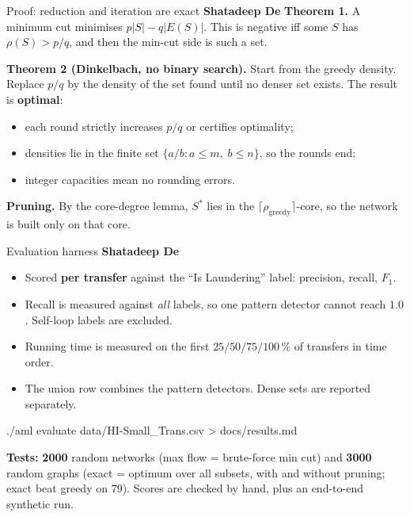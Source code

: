 \documentclass[aspectratio=169,11pt]{beamer}
\newcommand{\memberbadge}[1]{%
  \hfill{\small\bfseries\color{memberred}#1}%
}
\begin{document}
\begin{frame}{Proof: reduction and iteration are exact \memberbadge{Shatadeep De}}
\textbf{Theorem 1.} A minimum cut minimises $p|S| - q|E(S)|$. This is negative iff some $S$ has $\rho(S) > p/q$, and then the min-cut side is such a set.

\vspace{0.25cm}
\textbf{Theorem 2 (Dinkelbach, no binary search).} Start from the greedy density. Replace $p/q$ by the density of the set found until no denser set exists. The result is \textbf{optimal}:
\begin{itemize}
\setlength{\itemsep}{0.3em}
\item each round strictly increases $p/q$ or certifies optimality;
\item densities lie in the finite set $\{a/b : a \le m,\; b \le n\}$, so the rounds end;
\item integer capacities mean no rounding errors.
\end{itemize}

\vspace{0.25cm}
\textbf{Pruning.} By the core-degree lemma, $S^*$ lies in the $\lceil \rho_{\text{greedy}} \rceil$-core, so the network is built only on that core.
\end{frame}

\begin{frame}{Evaluation harness \memberbadge{Shatadeep De}}
\begin{itemize}
\setlength{\itemsep}{0.45em}
\item Scored \textbf{per transfer} against the ``Is Laundering'' label: precision, recall, $F_1$.
\item Recall is measured against \emph{all} labels, so one pattern detector cannot reach $1.0$. Self-loop labels are excluded.
\item Running time is measured on the first $25/50/75/100\,\%$ of transfers in time order.
\item The union row combines the pattern detectors. Dense sets are reported separately.
\end{itemize}

\vspace{0.15cm}
{\ttfamily ./aml evaluate data/HI-Small\_Trans.csv > docs/results.md}

\vspace{0.25cm}
\textbf{Tests:} \textbf{2000} random networks (max flow = brute-force min cut) and \textbf{3000} random graphs (exact = optimum over all subsets, with and without pruning; exact beat greedy on 79). Scores are checked by hand, plus an end-to-end synthetic run.
\end{frame}
\end{document}
